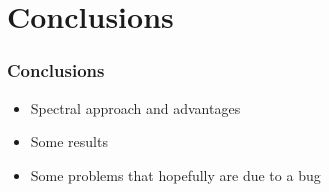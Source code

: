 \documentclass[pt12]{beamer}
\begin{document}
\section{Conclusions}
\frame\sectionpage


\begin{frame}
\frametitle{Conclusions}


\begin{itemize}

\item Spectral approach and advantages

\item Some results

\item Some problems that hopefully are due to a bug


\end{itemize}


\end{frame}
\end{document}
